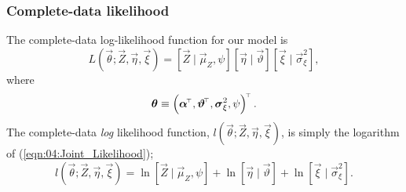 \documentclass[12pt,a4paper]{article}
\begin{document}
\subsubsection{Complete-data likelihood}

The complete-data log-likelihood function for our model is
\begin{equation}\label{eqn:04:Joint_Likelihood}
    L(\vec{\theta}; \vec{Z}, \vec{\eta}, \vec{\xi})
    =
    [\vec{Z} \mid \vec{\mu}_Z, \psi]
    [\vec{\eta} \mid \vec{\vartheta}]
    [\vec{\xi} \mid \vec{\sigma}^2_\xi], 
\end{equation}
 where
 \[
 \vec{\theta}
 \equiv
 \lr{
 \vec{\alpha}^\tp,
 \vec{\vartheta}^\tp, 
 \vec{\sigma}^2_\xi, 
 \psi
 }^\tp
 .
 \]
The complete-data \textit{log} likelihood function, $l(\vec{\theta}; \vec{Z}, \vec{\eta}, \vec{\xi})$, is simply the logarithm of (\ref{eqn:04:Joint_Likelihood});
\begin{equation}\label{eqn:04:Joint_Log_Likelihood}
    l(\vec{\theta}; \vec{Z}, \vec{\eta}, \vec{\xi})
    =
    \ln{[\vec{Z} \mid \vec{\mu}_Z, \psi]}
    +
    \ln{[\vec{\eta} \mid \vec{\vartheta}]}
    +
    \ln{[\vec{\xi} \mid \vec{\sigma}^2_\xi]}.
\end{equation}
\end{document}
